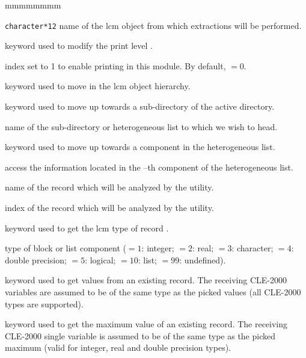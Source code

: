 \begin{ListeDeDescription}{mmmmmmmm}

\item[\dusa{NAME3}] {\tt character*12} name of the {\sc lcm} object from which
extractions will be performed.

\item[\moc{EDIT}] keyword used to modify the print level .

\item[\dusa{iprint}] index set to 1 to enable printing in this module. By default,  $=0$.

\item[\moc{STEP}] keyword used to move in the {\sc lcm} object hierarchy.

\item[\moc{UP}] keyword used to move up towards a sub-directory of the
active directory.

\item[\dusa{NOMDIR}] name of the sub-directory or heterogeneous list to which we wish to head.

\item[\moc{AT}] keyword used to move up towards a component in the heterogeneous list.

\item[\dusa{index}] access the information located in the --th component of the heterogeneous list.

\item[\dusa{BLOCK}] name of the record which will be analyzed by the
 utility.

\item[\dusa{index}] index of the record which will be analyzed by the
 utility.

\item[\moc{TYPE}] keyword used to get the {\sc lcm} type of record .

\item[\dusa{itype}] type of block  or list component  ($=1$: integer;
$=2$: real; $=3$: character; $=4$: double precision; $=5$: logical; $=10$: list; $=99$: undefined).

\item[\moc{GETVAL}] keyword used to get values from an existing record.
The receiving CLE-2000 variables are assumed to be of the same type as the
picked values (all CLE-2000 types are supported).

\item[\moc{MAXVAL}] keyword used to get the maximum value of an existing
record. The receiving CLE-2000 single variable is assumed to be of the same type
as the  picked maximum (valid for integer, real and double precision types).


\end{ListeDeDescription}
